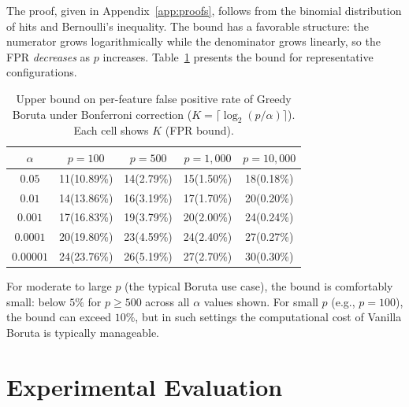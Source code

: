 \documentclass[runningheads]{llncs}
\begin{document}
The proof, given in Appendix~\ref{app:proofs}, follows from the binomial distribution of hits and Bernoulli's inequality. The bound has a favorable structure: the numerator grows logarithmically while the denominator grows linearly, so the FPR \emph{decreases} as $p$ increases. Table~\ref{tab:fpr} presents the bound for representative configurations.

\begin{table}[t]
\caption{Upper bound on per-feature false positive rate of Greedy Boruta under Bonferroni correction ($K = \lceil \log_2(p/\alpha) \rceil$). Each cell shows $K$ (FPR bound).}
\label{tab:fpr}
\centering
\begin{tabular}{ccccc}
\toprule
$\alpha$ & $p = 100$ & $p = 500$ & $p = 1{,}000$ & $p = 10{,}000$ \\
\midrule
$0.05$    & 11\;\;(10.89\%) & 14\;\;(2.79\%) & 15\;\;(1.50\%) & 18\;\;(0.18\%) \\
$0.01$    & 14\;\;(13.86\%) & 16\;\;(3.19\%) & 17\;\;(1.70\%) & 20\;\;(0.20\%) \\
$0.001$   & 17\;\;(16.83\%) & 19\;\;(3.79\%) & 20\;\;(2.00\%) & 24\;\;(0.24\%) \\
$0.0001$  & 20\;\;(19.80\%) & 23\;\;(4.59\%) & 24\;\;(2.40\%) & 27\;\;(0.27\%) \\
$0.00001$ & 24\;\;(23.76\%) & 26\;\;(5.19\%) & 27\;\;(2.70\%) & 30\;\;(0.30\%) \\
\bottomrule
\end{tabular}
\end{table}

For moderate to large $p$ (the typical Boruta use case), the bound is comfortably small: below $5\%$ for $p \geq 500$ across all $\alpha$ values shown. For small $p$ (e.g., $p = 100$), the bound can exceed $10\%$, but in such settings the computational cost of Vanilla Boruta is typically manageable.


 
\section{Experimental Evaluation}
\label{sec:experiments}
 
\end{document}
